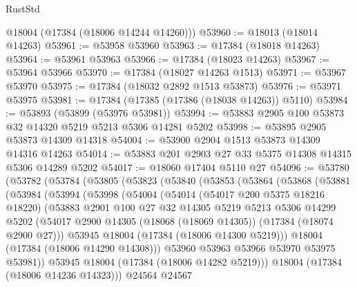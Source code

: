 \begin{lexlean}{RustStd}
\begin{coremodule}
      @18004
      (@17384 (@18006 @14244 @14260)))
@53960 := @18013 (@18014 @14263)
@53961 := @53958 @53960
@53963 := @17384 (@18018 @14263)
@53964 := @53961 @53963
@53966 := @17384 (@18023 @14263)
@53967 := @53964 @53966
@53970 := @17384 (@18027 @14263 @1513)
@53971 := @53967 @53970
@53975 := @17384 (@18032 @2892 @1513 @53873)
@53976 := @53971 @53975
@53981 := @17384 (@17385 (@17386 (@18038 @14263)) @5110)
@53984 := @53893 (@53899 (@53976 @53981))
@53994 := @53883 @2905 @100 @53873 @32 @14320 @5219 @5213 @5306 @14281 @5202
@53998 := @53895 @2905 @53873 @14309 @14318
@54004 := @53900 @2904 @1513 @53873 @14309 @14316 @14263
@54014 := @53883 @201 @2903 @27 @33 @5375 @14308 @14315 @5306 @14289 @5202
@54017 := @18060 @17404 @5110 @27
@54096 := @53780
    (@53782
      (@53784
        (@53805
          (@53823
            (@53840
              (@53853
                (@53864
                  (@53868
                    (@53881
                      (@53984
                        (@53994
                          (@53998
                            (@54004
                              (@54014
                                (@54017 @200 @5375 @18216 @18220)
                                (@53883
                                  @2901
                                  @100
                                  @27
                                  @32
                                  @14305
                                  @5219
                                  @5213
                                  @5306
                                  @14299
                                  @5202
                                  (@54017
                                    @2900
                                    @14305
                                    (@18068 (@18069 @14305))
                                    (@17384 (@18074 @2900 @27)))
                                  @53945
                                  @18004
                                  (@17384 (@18006 @14300 @5219)))
                                @18004
                                (@17384 (@18006 @14290 @14308)))
                              @53960
                              @53963
                              @53966
                              @53970
                              @53975
                              @53981))
                          @53945
                          @18004
                          (@17384 (@18006 @14282 @5219)))
                        @18004
                        (@17384 (@18006 @14236 @14323)))
                      @24564
                      @24567

\end{coremodule}
\end{lexlean}
